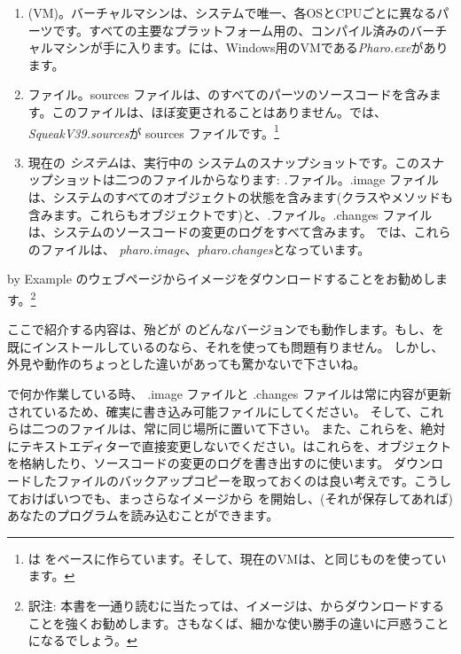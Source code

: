 \documentclass[a4paper,10pt,twoside]{book}
\begin{document}
\begin{enumerate}

  \item {} (VM)。バーチャルマシンは、システムで唯一、各OSとCPUごとに異なるパーツです。すべての主要なプラットフォーム用の、コンパイル済みのバーチャルマシンが手に入ります。には、Windows用のVMである\textit{Pharo.exe}があります。

  \item {}ファイル。sources ファイルは、\pharo のすべてのパーツのソースコードを含みます。このファイルは、ほぼ変更されることはありません。では、\emph{SqueakV39.sources}が sources ファイルです。\footnote{\pharo は  をベースに作らています。そして、現在のVMは、\squeak と同じものを使っています。}

  \item 現在の \emph{システム}は、実行中の \pharo システムのスナップショットです。このスナップショットは二つのファイルからなります: \emph{.}ファイル。.image ファイルは、システムのすべてのオブジェクトの状態を含みます(クラスやメソッドも含みます。これらもオブジェクトです)と、\emph{.}ファイル。.changes ファイルは、システムのソースコードの変更のログをすべて含みます。
では、これらのファイルは、 \emph{pharo.image}、\emph{pharo.changes}となっています。
\end{enumerate}

\pharo by Example のウェブページからイメージをダウンロードすることをお勧めします。\footnote{訳注: 本書を一通り読むに当たっては、イメージは、\pbe からダウンロードすることを強くお勧めします。さもなくば、細かな使い勝手の違いに戸惑うことになるでしょう。}

ここで紹介する内容は、殆どが \pharo のどんなバージョンでも動作します。もし、\pharo を既にインストールしているのなら、それを使っても問題有りません。
しかし、外見や動作のちょっとした違いがあっても驚かないで下さいね。

\pharo で何か作業している時、 .image ファイルと .changes ファイルは常に内容が更新されているため、確実に書き込み可能ファイルにしてください。
そして、これらは二つのファイルは、常に同じ場所に置いて下さい。
また、これらを、絶対にテキストエディターで直接変更しないでください。\pharo はこれらを、オブジェクトを格納したり、ソースコードの変更のログを書き出すのに使います。
ダウンロードしたファイルのバックアップコピーを取っておくのは良い考えです。こうしておけばいつでも、まっさらなイメージから \pharo を開始し、(それが保存してあれば)あなたのプログラムを読み込むことができます。
\end{document}
